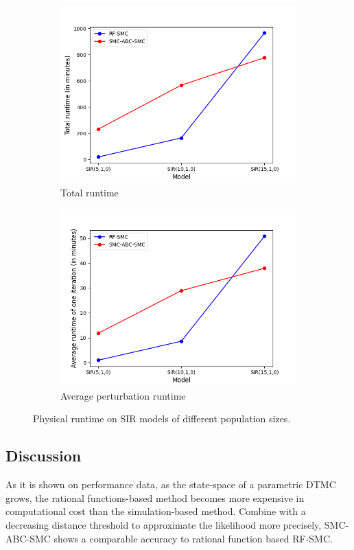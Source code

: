 \begin{figure}[H]
    \centering
    \begin{subfigure}{0.48\textwidth}
        \centering
        \includegraphics[width=\linewidth]{figures/sir_runtime_total.png}
        \caption{Total runtime}
    \end{subfigure}
    \hfill
    \begin{subfigure}{0.48\textwidth}
        \centering
        \includegraphics[width=\linewidth]{figures/sir_runtime_avg.png}
        \caption{Average perturbation runtime}
    \end{subfigure}
    \caption{Physical runtime on SIR models of different population sizes.}
\end{figure}

\subsection{Discussion}
As it is shown on performance data, as the state-space of a parametric DTMC grows, the rational
functions-based method becomes more expensive in computational cost than the simulation-based
method. Combine with a decreasing distance threshold to approximate the likelihood more precisely,
SMC-ABC-SMC shows a comparable accuracy to rational function based RF-SMC.



